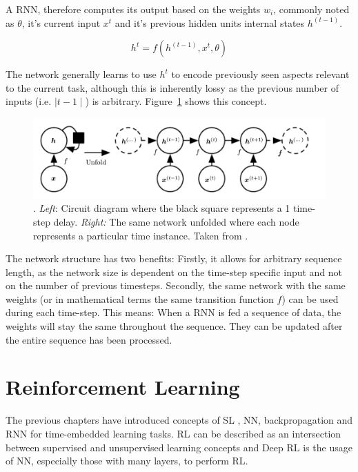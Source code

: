 A \ac {RNN}, therefore computes its output based on the weights $w_i$, commonly noted as $\theta$, it's current input
$x^t$ and it's previous hidden units internal states $h^(t-1)$.

\[
    h^t = f(h^(t-1), x^t, \theta)
\]

The network generally learns to use $h^t$ to encode previously seen aspects relevant to the current task, although this
is inherently lossy as the previous number of inputs (i.e. $\mid t-1\mid$) is arbitrary. Figure~\ref{fig:rnn_concept}
shows this concept.

\begin{figure}[]
    \centering
    \includegraphics[width=0.8\linewidth]{img/rnn_concept.png}
    \caption[Recurrent Neural Network conceptualized]{. \emph{Left}: Circuit diagram where the black square represents a
    1 time-step delay. \emph{Right:} The same network unfolded where each node represents a particular time instance.
    Taken from \citet{Goodfellow-et-al-2016}.}
    \label{fig:rnn_concept}
\end{figure}

The network structure has two benefits: Firstly, it allows for arbitrary sequence length, as the network size is
dependent on the time-step specific input and not on the number of previous timesteps. Secondly, the same network with
the same weights (or in mathematical terms the same transition function $f$) can be used during each time-step. This
means: When a \ac {RNN} is fed a sequence of data, the weights will stay the same throughout the sequence. They can be
updated after the entire sequence has been processed. 

\section{Reinforcement Learning}

The previous chapters have introduced concepts of \ac {SL} , \ac {NN}, backpropagation and \ac {RNN} for time-embedded
learning tasks. \ac {RL} can be described as an intersection between supervised and unsupervised learning concepts and
Deep \ac {RL} is the usage of \ac {NN}, especially those with many layers, to perform \ac {RL}.

